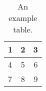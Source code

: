 \begin{table}[h]
\centering
\begin{tabular}{ l | c | r }
    \toprule
    1 & 2 & 3 \\ \hline
    4 & 5 & 6 \\ \hline
    7 & 8 & 9 \\
    \bottomrule
\end{tabular}
\caption{An example table.}
\label{tab:example}
\end{table}